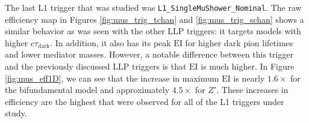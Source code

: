 The last L1 trigger that was studied was \texttt{L1\_SingleMuShower\_Nominal}. The raw efficiency map in Figures \ref{fig:mus_trig_tchan} and \ref{fig:mus_trig_schan} shows a similar behavior as was seen with the other LLP triggers: it targets models with higher $c\tau_{\text{dark}}$. In addition, it also has its peak $\text{EI}$ for higher dark pion lifetimes and lower mediator masses. However, a notable difference between this trigger and the previously discussed LLP triggers is that $\text{EI}$ is much higher. In Figure \ref{fig:mus_eff1D}, we can see that the increase in maximum $\text{EI}$ is nearly $1.6\times$ for the bifundamental model and approximately $4.5\times$ for $Z'$. These increases in efficiency are the highest that were observed for all of the L1 triggers under study.



